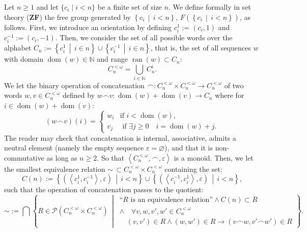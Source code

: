 \documentclass[11pt, a4paper, oneside]{article}
\theoremstyle{remark}
\theoremstyle{lemma}
\begin{document}
\subsection{}\label{A1}
Let \(n \ge 1\) and let \(\{c_i \mid i < n\}\) be a finite set of size \(n\). We define formally in set theory (\textbf{ZF}) the free group generated by \(\left\{ c_i \,\middle|\, i < n \right\}\), 
\(F\left(\left\{ c_i \,\middle|\, i < n \right\}\right)\), as follows. First, we introduce an orientation by defining 
\(c_i^{1} := \left(c_i, 1\right)\) and \(c_i^{-1} := \left(c_i, -1\right)\). Then, we consider the set of all possible words over the alphabet \(C_n := \left\{ c_i^{1} \,\middle|\, i \in n \right\} \cup \left\{ c_i^{-1} \,\middle|\, i \in n \right\}\), that is, the set of all sequences \(w\) with domain \(\operatorname{dom}(w) \in \mathbb{N}\) and range \(\operatorname{ran}(w) \subset C_n\):
\[
C_n^{< \omega} = \bigcup_{i \in \mathbb{N}} C_n^i.
\]
We let the binary operation of concatenation $\frown:C_n^{<\omega}\times C_n^{<\omega}\rightarrow C_n^{<\omega}$ of two words $w,v\in C_n^{< \omega}$ defined by $w\frown v:\operatorname{dom}(w)+\operatorname{dom}(v)\rightarrow C_n$ where for $i\in \operatorname{dom}(w)+\operatorname{dom}(v)$:
$$(w\frown v)(i)=\begin{cases}w_i &\text{if } i<\operatorname{dom}(w),\\
v_j &\text{ if }\exists j\geq 0\quad i=\operatorname{dom}(w)+j.\end{cases}$$ The reader may check that concatenation is internal, associative, admits a neutral element (namely the empty sequence $\varepsilon = \varnothing$), and that it is non-commutative as long as $n\geq 2$. So that \(\left\langle C_n^{<\omega},\frown,\varepsilon\right\rangle\) is a monoïd. Then, we let the smallest equivalence relation $\sim\, \subset C_n^{< \omega} \times C_n^{< \omega}$ containing the set:
\[
C\left(n\right) := \left\{\left(\left\langle c_{i}^{1}, c_{i}^{-1}\right\rangle, \varepsilon\right) \,\middle|\, i < n\right\} \cup \left\{\left(\left\langle c_{i}^{-1}, c_{i}^{1}\right\rangle, \varepsilon\right) \,\middle|\, i < n\right\},
\]
such that the operation of concatenation passes to the quotient:
\[
\sim := \bigcap \left\{R \in \mathscr{P}\left(C_{n}^{<\omega} \times C_{n}^{<\omega}\right) \,\middle|\, 
\begin{array}{l}
\text{``}R\text{ is an equivalence relation''} \wedge C\left(n\right) \subset R \\
\wedge \quad \forall v, w, v', w' \in C_n^{<\omega} \\
\quad \left(v, v'\right) \in R \land \left(w, w'\right) \in R \rightarrow \left(v \frown w, v' \frown w'\right) \in R
\end{array}
\right\}.
\]
\end{document}
